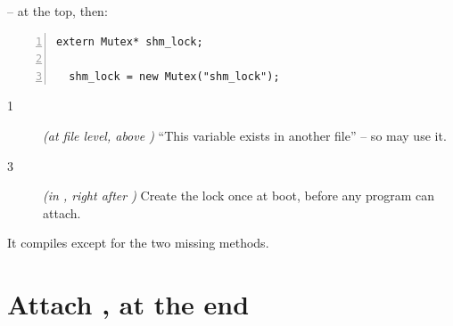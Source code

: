 \documentclass[11pt]{report}
\newcommand{\done}[1]{\begin{keybox}[title={Done when}]#1\end{keybox}}
\begin{document}
\textbf{} --  at the top, then:
\begin{lstlisting}[style=cpp,numbers=left,numberstyle=\tiny\color{headgray}]
extern Mutex* shm_lock;

  shm_lock = new Mutex("shm_lock");
\end{lstlisting}
\begin{description}
  \item[1] \emph{(at file level, above )} ``This variable exists in another file'' -- so
         may use it.
  \item[3] \emph{(in , right after )} Create the lock once at boot,
        before any program can attach.
\end{description}

\done{It compiles except for the two missing methods.}

\section{Attach \hfill {\normalsize{}, at the end}}
\end{document}
